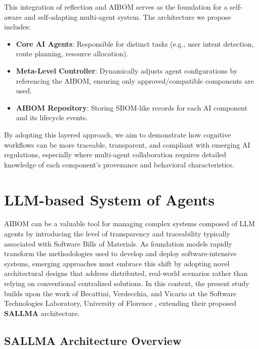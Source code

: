 \noindent
This integration of reflection and AIBOM serves as the foundation for a self-aware and self-adapting multi-agent system. The architecture we propose includes:


\begin{itemize}[leftmargin=*, label=--]
    \item \textbf{Core AI Agents}: Responsible for distinct tasks (e.g., user intent detection, route planning, resource allocation).
    \item \textbf{Meta-Level Controller}: Dynamically adjusts agent configurations by referencing the AIBOM, ensuring only approved/compatible components are used.
    \item \textbf{AIBOM Repository}: Storing SBOM-like records for each AI component and its lifecycle events.
\end{itemize}

\noindent
By adopting this layered approach, we aim to demonstrate how cognitive workflows can be more traceable, transparent, and compliant with emerging AI regulations, especially where multi-agent collaboration requires detailed knowledge of each component’s provenance and behavioral characteristics.


\section{LLM-based System of Agents} 
\label{sec:AIBOM-system-of-agents}

AIBOM can be a valuable tool for managing complex systems composed of LLM agents by introducing the level of transparency and traceability typically associated with Software Bills of Materials. As foundation models rapidly transform the methodologies used to develop and deploy software-intensive systems, emerging approaches must embrace this shift by adopting novel architectural designs that address distributed, real-world scenarios rather than relying on conventional centralized solutions. In this context, the present study builds upon the work of Becattini, Verdecchia, and Vicario at the Software Technologies Laboratory, University of Florence \cite{becattini2025sallma}, extending their proposed \textbf{SALLMA} architecture.


\subsection{SALLMA Architecture Overview}
\label{sec:sallma}


